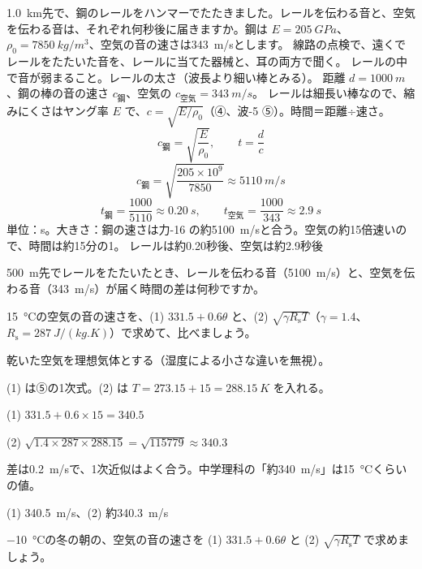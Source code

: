 \begin{phreidai}[レールを伝わる音]
\label{ph:波-9:ex5}\qty{1.0}{km}先で、鋼のレールをハンマーでたたきました。レールを伝わる音と、空気を伝わる音は、それぞれ何秒後に届きますか。鋼は $E=\qty{205}{GPa}$、$\rho_0=\qty{7850}{kg/m^3}$、空気の音の速さは\qty{343}{m/s}とします。
\phbamen
線路の点検で、遠くでレールをたたいた音を、レールに当てた器械と、耳の両方で聞く。
\phmushi
レールの中で音が弱まること。レールの太さ（波長より細い棒とみる）。
\phzu
距離 $d=\qty{1000}{m}$、鋼の棒の音の速さ $c_{\text{鋼}}$、空気の $c_{\text{空気}}=\qty{343}{m/s}$。
\phriyu
レールは細長い棒なので、縮みにくさはヤング率 $E$ で、$c=\sqrt{E/\rho_0}$（④、波-5 ⑤）。時間＝距離÷速さ。
\phtateru
\[ c_{\text{鋼}}=\sqrt{\frac{E}{\rho_0}},\qquad t=\frac{d}{c} \]
\phtoku
\[ c_{\text{鋼}}=\sqrt{\frac{205\times10^9}{7850}}\approx\qty{5110}{m/s} \]
\[ t_{\text{鋼}}=\frac{1000}{5110}\approx\qty{0.20}{s},\qquad t_{\text{空気}}=\frac{1000}{343}\approx\qty{2.9}{s} \]
\phtashikame
単位：s。大きさ：鋼の速さは力-16 の約\qty{5100}{m/s}と合う。空気の約15倍速いので、時間は約15分の1。
\kotae レールは約0.20秒後、空気は約2.9秒後
\end{phreidai}
\begin{jibun}
\qty{500}{m}先でレールをたたいたとき、レールを伝わる音（\qty{5100}{m/s}）と、空気を伝わる音（\qty{343}{m/s}）が届く時間の差は何秒ですか。
\end{jibun}

\begin{reidai}
\label{ph:波-9:ex6}\qty{15}{\celsius}の空気の音の速さを、(1) $331.5+0.6\theta$ と、(2) $\sqrt{\gamma R_{\mathrm s}T}$（$\gamma=1.4$、$R_{\mathrm s}=\qty{287}{J/(kg.K)}$）で求めて、比べましょう。
\par{} 乾いた空気を理想気体とする（湿度による小さな違いを無視）。
\par\kangaekata (1) は⑤の1次式。(2) は $T=273.15+15=\qty{288.15}{K}$ を入れる。
\par\shiki (1) $331.5+0.6\times15=340.5$
\par\hspace*{2\zw}(2) $\sqrt{1.4\times287\times288.15}=\sqrt{\num{115779}}\approx340.3$
\par{} 差は\qty{0.2}{m/s}で、1次近似はよく合う。中学理科の「約\qty{340}{m/s}」は\qty{15}{\celsius}くらいの値。
\par\kotae (1) \qty{340.5}{m/s}、(2) 約\qty{340.3}{m/s}
\end{reidai}
\begin{jibun}
\qty{-10}{\celsius}の冬の朝の、空気の音の速さを (1) $331.5+0.6\theta$ と (2) $\sqrt{\gamma R_{\mathrm s}T}$ で求めましょう。
\end{jibun}

